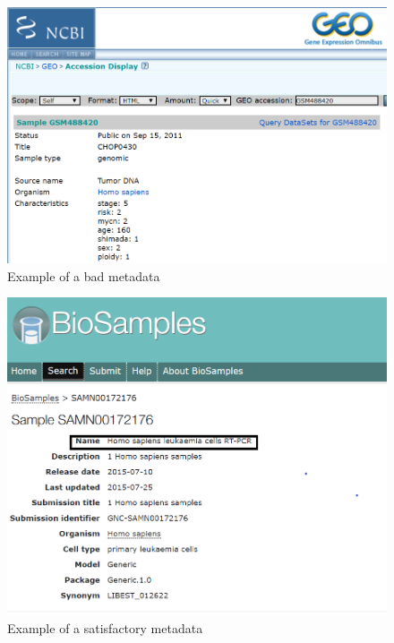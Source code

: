 \begin{figure}[ht]
    \centering
    \includegraphics[scale=0.5]{Figures/Capture_geo.png}
    \caption{Example of a bad metadata}
    \label{fig:bad_meadata}
\end{figure}

\begin{figure}[ht]
    \centering
    \includegraphics[scale = 0.4]{Figures/Biosamples.png}
    \caption{Example of a satisfactory metadata}
    \label{fig:biosample}
\end{figure}

